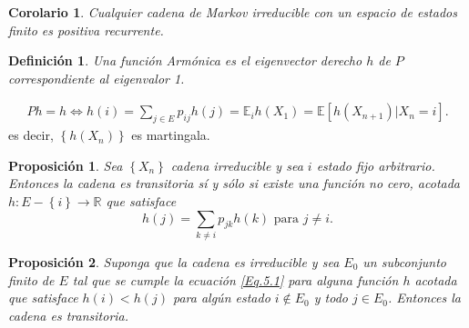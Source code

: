 \documentclass{article}
\newtheorem{Def}{Definición}[section]
\newtheorem{Prop}{Proposición}[section]
\newtheorem{Cor}{Corolario}[section]
\newcommand{\rea}{\mathbb{R}}
\newcommand{\esp}{\mathbb{E}}
\numberwithin{equation}{section}
\begin{document}
\begin{Cor}\label{Cor.3.6}
Cualquier cadena de Markov irreducible con un espacio de estados finito es positiva recurrente.
\end{Cor}

\begin{Def}\label{Def.Armonica}
Una funci\'on Arm\'onica es el eigenvector derecho $h$ de $P$ correspondiente al eigenvalor 1.
\end{Def}
\begin{eqnarray}
Ph=h\Leftrightarrow h\left(i\right)=\sum_{j\in E}p_{ij}h\left(j\right)=\esp_{i}h\left(X_{1}\right)=\esp\left[h\left(X_{n+1}\right)|X_{n}=i\right].
\end{eqnarray}
es decir, $\left\{h\left(X_{n}\right)\right\}$ es martingala.\\

\begin{Prop}\label{Prop.5.2}
Sea $\left\{X_{n}\right\}$ cadena irreducible  y sea $i$ estado fijo arbitrario. Entonces la cadena es transitoria s\'i y s\'olo si existe una funci\'on no cero, acotada $h:E-\left\{i\right\}\rightarrow\rea$ que satisface
\begin{equation}\label{Eq.5.1}
h\left(j\right)=\sum_{k\neq i}p_{jk}h\left(k\right)\textrm{   para }j\neq i.
\end{equation}
\end{Prop}

\begin{Prop}\label{Prop.5.4}
Suponga que la cadena es irreducible y sea $E_{0}$ un subconjunto finito de $E$ tal que se cumple la ecuaci\'on \ref{Eq.5.1} para alguna funci\'on $h$ acotada que satisface $h\left(i\right)<h\left(j\right)$ para alg\'un estado $i\notin E_{0}$ y todo $j\in E_{0}$. Entonces la cadena es transitoria.
\end{Prop}

\end{document}
